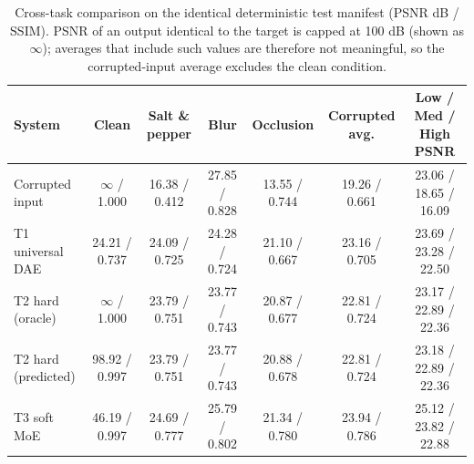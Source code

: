 \begin{table}[t]\centering\caption{Cross-task comparison on the identical deterministic test manifest (PSNR dB / SSIM). PSNR of an output identical to the target is capped at 100 dB (shown as $\infty$); averages that include such values are therefore not meaningful, so the corrupted-input average excludes the clean condition.}\label{tab:compare}
\begin{tabular}{lcccccc}\toprule System & Clean & Salt \& pepper & Blur & Occlusion & Corrupted avg. & Low / Med / High PSNR\\\midrule
Corrupted input & $\infty$ / 1.000 & 16.38 / 0.412 & 27.85 / 0.828 & 13.55 / 0.744 & 19.26 / 0.661 & 23.06 / 18.65 / 16.09 \\
T1 universal DAE & 24.21 / 0.737 & 24.09 / 0.725 & 24.28 / 0.724 & 21.10 / 0.667 & 23.16 / 0.705 & 23.69 / 23.28 / 22.50\\
T2 hard (oracle) & $\infty$ / 1.000 & 23.79 / 0.751 & 23.77 / 0.743 & 20.87 / 0.677 & 22.81 / 0.724 & 23.17 / 22.89 / 22.36\\
T2 hard (predicted) & 98.92 / 0.997 & 23.79 / 0.751 & 23.77 / 0.743 & 20.88 / 0.678 & 22.81 / 0.724 & 23.18 / 22.89 / 22.36\\
T3 soft MoE & 46.19 / 0.997 & 24.69 / 0.777 & 25.79 / 0.802 & 21.34 / 0.780 & 23.94 / 0.786 & 25.12 / 23.82 / 22.88\\
\bottomrule\end{tabular}\end{table}